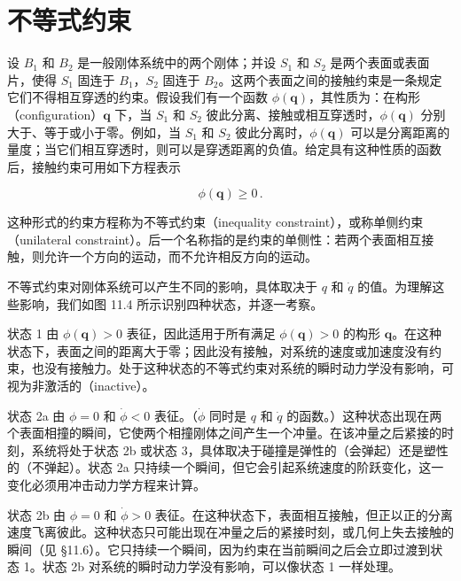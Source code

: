 \documentclass[10pt,a4paper]{book}
\theoremstyle{thmstyle} %
\theoremstyle{defstyle} %
\theoremstyle{prostyle} %
\begin{document}
\section{不等式约束}





设 $B_{1}$ 和 $B_{2}$ 是一般刚体系统中的两个刚体；并设 $S_{1}$ 和 $S_{2}$ 是两个表面或表面片，使得 $S_{1}$ 固连于 $B_{1}$，$S_{2}$ 固连于 $B_{2}$。这两个表面之间的接触约束是一条规定它们不得相互穿透的约束。假设我们有一个函数 $\phi(\boldsymbol{q})$，其性质为：在构形（configuration）$\boldsymbol{q}$ 下，当 $S_{1}$ 和 $S_{2}$ 彼此分离、接触或相互穿透时，$\phi(\boldsymbol{q})$ 分别大于、等于或小于零。例如，当 $S_{1}$ 和 $S_{2}$ 彼此分离时，$\phi(\boldsymbol{q})$ 可以是分离距离的量度；当它们相互穿透时，则可以是穿透距离的负值。给定具有这种性质的函数后，接触约束可用如下方程表示



$$
\phi ( \boldsymbol{ q } ) \geq 0 \, .
$$



这种形式的约束方程称为不等式约束（inequality constraint），或称单侧约束（unilateral constraint）。后一个名称指的是约束的单侧性：若两个表面相互接触，则允许一个方向的运动，而不允许相反方向的运动。



不等式约束对刚体系统可以产生不同的影响，具体取决于 $q$ 和 $\dot{q}$ 的值。为理解这些影响，我们如图 11.4 所示识别四种状态，并逐一考察。



状态 1 由 $\phi(\boldsymbol{q}) > 0$ 表征，因此适用于所有满足 $\phi(\boldsymbol{q}) > 0$ 的构形 $\boldsymbol{q}$。在这种状态下，表面之间的距离大于零；因此没有接触，对系统的速度或加速度没有约束，也没有接触力。处于这种状态的不等式约束对系统的瞬时动力学没有影响，可视为非激活的（inactive）。



状态 2a 由 $\phi=0$ 和 $\dot{\phi}<0$ 表征。（$\dot{\phi}$ 同时是 $q$ 和 $\dot{q}$ 的函数。）这种状态出现在两个表面相撞的瞬间，它使两个相撞刚体之间产生一个冲量。在该冲量之后紧接的时刻，系统将处于状态 2b 或状态 3，具体取决于碰撞是弹性的（会弹起）还是塑性的（不弹起）。状态 2a 只持续一个瞬间，但它会引起系统速度的阶跃变化，这一变化必须用冲击动力学方程来计算。



状态 2b 由 $\phi=0$ 和 $\dot{\phi}>0$ 表征。在这种状态下，表面相互接触，但正以正的分离速度飞离彼此。这种状态只可能出现在冲量之后的紧接时刻，或几何上失去接触的瞬间（见 §11.6）。它只持续一个瞬间，因为约束在当前瞬间之后会立即过渡到状态 1。状态 2b 对系统的瞬时动力学没有影响，可以像状态 1 一样处理。
\end{document}
